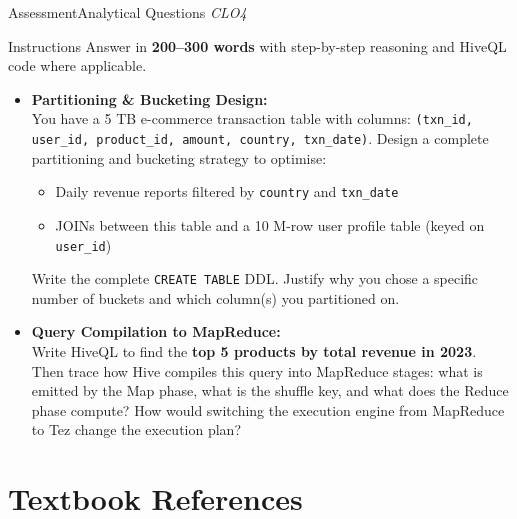 \documentclass[aspectratio=169,10pt]{beamer}
\begin{document}
\begin{frame}[fragile]{Assessment\textemdash Analytical Questions \hfill\small\textit{CLO4}}
  \begin{block}{Instructions}
    Answer in \textbf{200--300 words} with step-by-step reasoning and HiveQL code where applicable.
  \end{block}
  \vspace{6pt}
  \begin{itemize}
    \item[\textbf{A1.}] \textbf{Partitioning \& Bucketing Design:}\\
    You have a 5 TB e-commerce transaction table with columns: \texttt{(txn\_id, user\_id, product\_id, amount, country, txn\_date)}.  Design a complete partitioning and bucketing strategy to optimise:
    \begin{itemize}
      \item Daily revenue reports filtered by \texttt{country} and \texttt{txn\_date}
      \item JOINs between this table and a 10 M-row user profile table (keyed on \texttt{user\_id})
    \end{itemize}
    Write the complete \texttt{CREATE TABLE} DDL.  Justify why you chose a specific number of buckets and which column(s) you partitioned on.
  \end{itemize}
  \vspace{6pt}
  \begin{itemize}
    \item[\textbf{A2.}] \textbf{Query Compilation to MapReduce:}\\
    Write HiveQL to find the \textbf{top 5 products by total revenue in 2023}.  Then trace how Hive compiles this query into MapReduce stages: what is emitted by the Map phase, what is the shuffle key, and what does the Reduce phase compute?  How would switching the execution engine from MapReduce to Tez change the execution plan?
  \end{itemize}
\end{frame}

\section*{Textbook References}
\end{document}
